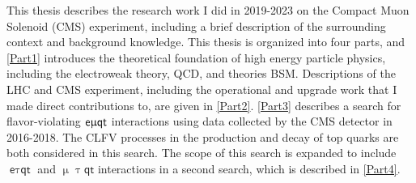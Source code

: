 This thesis describes the research work I did in 2019-2023 on the Compact Muon Solenoid (\ac{CMS}) experiment, including a brief description of the surrounding context and background knowledge. This thesis is organized into four parts, and \autoref{Part1} introduces the theoretical foundation of high energy particle physics, including the electroweak theory, \ac{QCD}, and theories \ac{BSM}. Descriptions of the \ac{LHC} and {CMS} experiment, including the operational and upgrade work that I made direct contributions to, are given in \autoref{Part2}. \autoref{Part3} describes a search for flavor-violating $\textsf{e}\upmu\textsf{{q}t}$ interactions using data collected by the \ac{CMS} detector in 2016-2018. The \ac{CLFV} processes in the production and decay of top quarks are both considered in this search. The scope of this search is expanded to include $\textsf{e}\uptau\textsf{qt}$ and $\upmu\uptau\textsf{qt}$ interactions in a second search, which is described in \autoref{Part4}.




